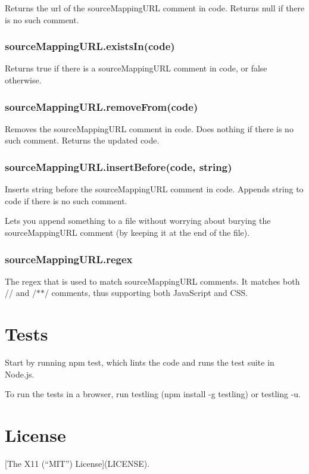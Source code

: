 Returns the url of the source\+Mapping\+U\+RL comment in {\ttfamily code}. Returns {\ttfamily null} if there is no such comment.

\subsubsection*{{\ttfamily source\+Mapping\+U\+R\+L.\+exists\+In(code)}}

Returns {\ttfamily true} if there is a source\+Mapping\+U\+RL comment in {\ttfamily code}, or {\ttfamily false} otherwise.

\subsubsection*{{\ttfamily source\+Mapping\+U\+R\+L.\+remove\+From(code)}}

Removes the source\+Mapping\+U\+RL comment in {\ttfamily code}. Does nothing if there is no such comment. Returns the updated {\ttfamily code}.

\subsubsection*{{\ttfamily source\+Mapping\+U\+R\+L.\+insert\+Before(code, string)}}

Inserts {\ttfamily string} before the source\+Mapping\+U\+RL comment in {\ttfamily code}. Appends {\ttfamily string} to {\ttfamily code} if there is no such comment.

Lets you append something to a file without worrying about burying the source\+Mapping\+U\+RL comment (by keeping it at the end of the file).

\subsubsection*{{\ttfamily source\+Mapping\+U\+R\+L.\+regex}}

The regex that is used to match source\+Mapping\+U\+RL comments. It matches both {\ttfamily //} and {\ttfamily /$\ast$$\ast$/} comments, thus supporting both Java\+Script and C\+SS.

\section*{Tests }

Start by running {\ttfamily npm test}, which lints the code and runs the test suite in Node.\+js.

To run the tests in a browser, run {\ttfamily testling} ({\ttfamily npm install -\/g testling}) or {\ttfamily testling -\/u}.

\section*{License }

\mbox{[}The X11 (“\+M\+I\+T”) License\mbox{]}(L\+I\+C\+E\+N\+SE). 